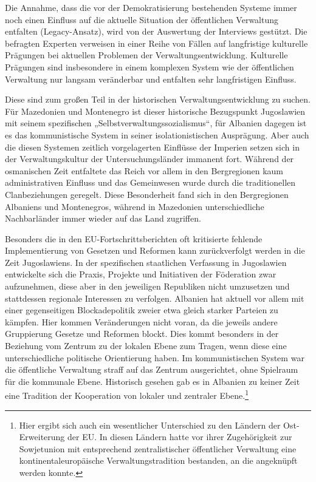 Die Annahme, dass die vor der Demokratisierung bestehenden Systeme immer noch einen Einfluss auf die aktuelle Situation der öffentlichen Verwaltung entfalten (Legacy-Ansatz), wird von der Auswertung der Interviews gestützt. Die befragten Experten verweisen in einer Reihe von Fällen auf langfristige kulturelle Prägungen bei aktuellen Problemen der Verwaltungsentwicklung. Kulturelle Prägungen sind insbesondere in einem komplexen System wie der öffentlichen Verwaltung nur langsam veränderbar und entfalten sehr langfristigen Einfluss.\par
Diese sind zum großen Teil in der historischen Verwaltungsentwicklung zu suchen. Für Mazedonien und Montenegro ist dieser historische Bezugspunkt Jugoslawien mit seinem spezifischen „Selbstverwaltungssozialismus“, für Albanien dagegen ist es das kommunistische System in seiner isolationistischen Ausprägung. Aber auch die diesen Systemen zeitlich vorgelagerten Einflüsse der Imperien setzen sich in der Verwaltungskultur der Untersuchungsländer immanent fort. Während der osmanischen Zeit entfaltete das Reich vor allem in den Bergregionen kaum administrativen Einfluss und das Gemeinwesen wurde durch die traditionellen Clanbeziehungen geregelt. Diese Besonderheit fand sich in den Bergregionen Albaniens und Montenegros, während in Mazedonien unterschiedliche Nachbarländer immer wieder auf das Land zugriffen.\par
Besonders die in den EU-Fortschrittsberichten oft kritisierte fehlende Implementierung von Gesetzen und Reformen kann zurückverfolgt werden in die Zeit Jugoslawiens. In der spezifischen staatlichen Verfassung in Jugoslawien entwickelte sich die Praxis, Projekte und Initiativen der Föderation zwar aufzunehmen, diese aber in den jeweiligen Republiken nicht umzusetzen und stattdessen regionale Interessen zu verfolgen. Albanien hat aktuell vor allem mit einer gegenseitigen Blockadepolitik zweier etwa gleich starker Parteien zu kämpfen. Hier kommen Veränderungen nicht voran, da die jeweils andere Gruppierung Gesetze und Reformen blockt. Dies kommt besonders in der Beziehung vom Zentrum zu der lokalen Ebene zum Tragen, wenn diese eine unterschiedliche politische Orientierung haben. Im kommunistischen System war die öffentliche Verwaltung straff auf das Zentrum ausgerichtet, ohne Spielraum für die kommunale Ebene. Historisch gesehen gab es in Albanien zu keiner Zeit eine Tradition der Kooperation von lokaler und zentraler Ebene.\footnote{Hier ergibt sich auch ein wesentlicher Unterschied zu den Ländern der Ost-Erweiterung der EU. In diesen Ländern hatte vor ihrer Zugehörigkeit zur Sowjetunion mit entsprechend zentralistischer öffentlicher Verwaltung eine kontinentaleuropäische Verwaltungstradition bestanden, an die angeknüpft werden konnte.
}\par
